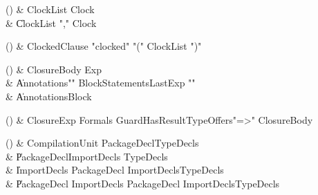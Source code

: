 \begin{bbgrammarappendix}

() & ClockList \label{prod:ClockList}  \: Clock  \\

 &    \| ClockList \xcd"," Clock \\

\end{bbgrammarappendix}

\begin{bbgrammarappendix}

() & ClockedClause \label{prod:ClockedClause}  \: \xcd"clocked" \xcd"(" ClockList \xcd")"  \\


\end{bbgrammarappendix}

\begin{bbgrammarappendix}

() & ClosureBody \label{prod:ClosureBody}  \: Exp  \\

 &    \| Annotations\opt \xcd"{" BlockStatements\opt LastExp \xcd"}" \\
 &    \| Annotations\opt Block \\

\end{bbgrammarappendix}

\begin{bbgrammarappendix}

() & ClosureExp \label{prod:ClosureExp}  \: Formals Guard\opt HasResultType\opt Offers\opt \xcd"=>" ClosureBody  \\


\end{bbgrammarappendix}

\begin{bbgrammarappendix}

() & CompilationUnit \label{prod:CompilationUnit}  \: PackageDecl\opt TypeDecls\opt  \\

 &    \| PackageDecl\opt ImportDecls TypeDecls\opt \\
 &    \| ImportDecls PackageDecl  ImportDecls\opt  TypeDecls\opt \\
 &    \| PackageDecl ImportDecls PackageDecl  ImportDecls\opt  TypeDecls\opt \\

\end{bbgrammarappendix}

